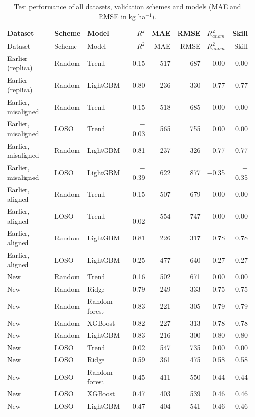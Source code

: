 \begingroup\footnotesize
\begin{longtable}{@{}lllrrrrr@{}}
\caption{Test performance of all datasets, validation schemes and models (MAE and RMSE in kg ha$^{-1}$).}\label{tab:S_cv}\\
\toprule
Dataset & Scheme & Model & $R^2$ & MAE & RMSE & $R^2_{anom}$ & Skill \\
\midrule
\endfirsthead
\toprule
Dataset & Scheme & Model & $R^2$ & MAE & RMSE & $R^2_{anom}$ & Skill \\
\midrule
\endhead
Earlier (replica) & Random & Trend & 0.15 & 517 & 687 & 0.00 & 0.00 \\
Earlier (replica) & Random & LightGBM & 0.80 & 236 & 330 & 0.77 & 0.77 \\
Earlier, misaligned & Random & Trend & 0.15 & 518 & 685 & 0.00 & 0.00 \\
Earlier, misaligned & LOSO & Trend & $-$0.03 & 565 & 755 & 0.00 & 0.00 \\
Earlier, misaligned & Random & LightGBM & 0.81 & 237 & 326 & 0.77 & 0.77 \\
Earlier, misaligned & LOSO & LightGBM & $-$0.39 & 622 & 877 & $-$0.35 & $-$0.35 \\
Earlier, aligned & Random & Trend & 0.15 & 507 & 679 & 0.00 & 0.00 \\
Earlier, aligned & LOSO & Trend & $-$0.02 & 554 & 747 & 0.00 & 0.00 \\
Earlier, aligned & Random & LightGBM & 0.81 & 226 & 317 & 0.78 & 0.78 \\
Earlier, aligned & LOSO & LightGBM & 0.25 & 477 & 640 & 0.27 & 0.27 \\
New & Random & Trend & 0.16 & 502 & 671 & 0.00 & 0.00 \\
New & Random & Ridge & 0.79 & 249 & 333 & 0.75 & 0.75 \\
New & Random & Random forest & 0.83 & 221 & 305 & 0.79 & 0.79 \\
New & Random & XGBoost & 0.82 & 227 & 313 & 0.78 & 0.78 \\
New & Random & LightGBM & 0.83 & 216 & 300 & 0.80 & 0.80 \\
New & LOSO & Trend & 0.02 & 547 & 735 & 0.00 & 0.00 \\
New & LOSO & Ridge & 0.59 & 361 & 475 & 0.58 & 0.58 \\
New & LOSO & Random forest & 0.45 & 411 & 550 & 0.44 & 0.44 \\
New & LOSO & XGBoost & 0.47 & 403 & 539 & 0.46 & 0.46 \\
New & LOSO & LightGBM & 0.47 & 404 & 541 & 0.46 & 0.46 \\

\end{longtable}
